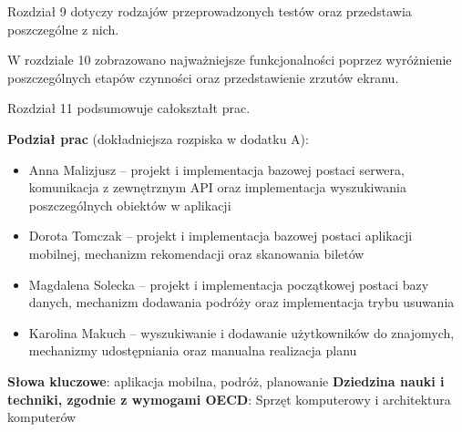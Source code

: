 \par Rozdział 9 dotyczy rodzajów przeprowadzonych testów oraz przedstawia poszczególne z nich.

\par W rozdziale 10 zobrazowano najważniejsze funkcjonalności poprzez wyróżnienie poszczególnych etapów czynności oraz przedstawienie zrzutów ekranu. 

\par Rozdział 11 podsumowuje całokształt prac.

\par \textbf{Podział prac} (dokładniejsza rozpiska w dodatku A):
\begin{itemize}
\item Anna Malizjusz --  projekt i implementacja bazowej postaci serwera, komunikacja z zewnętrznym API oraz implementacja wyszukiwania poszczególnych obiektów w aplikacji
\item Dorota Tomczak -- projekt i implementacja bazowej postaci aplikacji mobilnej, mechanizm rekomendacji oraz skanowania biletów
\item Magdalena Solecka -- projekt i implementacja początkowej postaci bazy danych, mechanizm dodawania podróży oraz implementacja trybu usuwania
\item Karolina Makuch -- wyszukiwanie i dodawanie użytkowników do znajomych, mechanizmy udostępniania oraz manualna realizacja planu
\end{itemize}
\newline
\newline\textbf{Słowa kluczowe}: aplikacja mobilna, podróż, planowanie
\newline\textbf{Dziedzina nauki i techniki, zgodnie z wymogami OECD}: Sprzęt komputerowy i architektura komputerów
